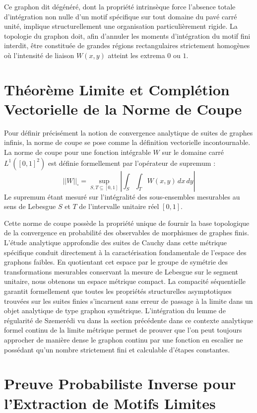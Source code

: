 \documentclass[11pt, a4paper]{article}
\begin{document}
Ce graphon dit dégénéré, dont la propriété intrinsèque force l'absence totale d'intégration non nulle d'un motif spécifique sur tout domaine du pavé carré unité, implique structurellement une organisation particulièrement rigide.
La topologie du graphon doit, afin d'annuler les moments d'intégration du motif fini interdit, être constituée de grandes régions rectangulaires strictement homogènes où l'intensité de liaison $W(x,y)$ atteint les extrema $0$ ou $1$.

\section{Théorème Limite et Complétion Vectorielle de la Norme de Coupe}

Pour définir précisément la notion de convergence analytique de suites de graphes infinis, la norme de coupe se pose comme la définition vectorielle incontournable.
La norme de coupe pour une fonction intégrable $W$ sur le domaine carré $L^1([0, 1]^2)$ est définie formellement par l'opérateur de supremum :
$$||W||_{\square} = \sup_{S,T \subseteq [0,1]} \left| \int_S \int_T W(x,y) \,dx \,dy \right|$$
Le supremum étant mesuré sur l'intégralité des sous-ensembles mesurables au sens de Lebesgue $S$ et $T$ de l'intervalle unitaire réel $[0, 1]$.

Cette norme de coupe possède la propriété unique de fournir la base topologique de la convergence en probabilité des observables de morphismes de graphes finis.
L'étude analytique approfondie des suites de Cauchy dans cette métrique spécifique conduit directement à la caractérisation fondamentale de l'espace des graphons faibles. En quotientant cet espace par le groupe de symétrie des transformations mesurables conservant la mesure de Lebesgue sur le segment unitaire, nous obtenons un espace métrique compact.
La compacité séquentielle garantit formellement que toutes les propriétés structurelles asymptotiques trouvées sur les suites finies s'incarnent sans erreur de passage à la limite dans un objet analytique de type graphon symétrique.
L'intégration du lemme de régularité de Szemerédi vu dans la section précédente dans ce contexte analytique formel continu de la limite métrique permet de prouver que l'on peut toujours approcher de manière dense le graphon continu par une fonction en escalier ne possédant qu'un nombre strictement fini et calculable d'étapes constantes.

\section{Preuve Probabiliste Inverse pour l'Extraction de Motifs Limites}
\end{document}

